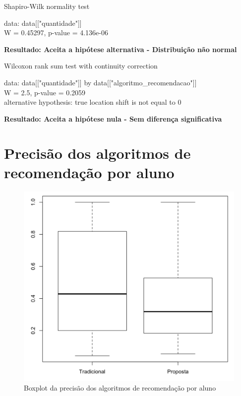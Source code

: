   Shapiro-Wilk normality test

\noindent
data:  data[["quantidade"]]\\
W = 0.45297, p-value = 4.136e-06

\noindent
\textbf{Resultado: Aceita a hipótese alternativa - Distribuição não normal}

Wilcoxon rank sum test with continuity correction

\noindent
data:  data[["quantidade"]] by data[["algoritmo\_recomendacao"]]\\
W = 2.5, p-value = 0.2059\\
alternative hypothesis: true location shift is not equal to 0

\noindent
\textbf{Resultado: Aceita a hipótese nula - Sem diferença significativa}

\newpage
\section{Precisão dos algoritmos de recomendação por aluno}

\begin{figure}[htb]
  \caption{\label{fig:precisao-boxplot}Boxplot da precisão dos algoritmos de recomendação por aluno}
  \begin{center}
      \includegraphics[scale=0.4]{./Figuras/precisao-boxplot.png}
  \end{center}
\end{figure}

